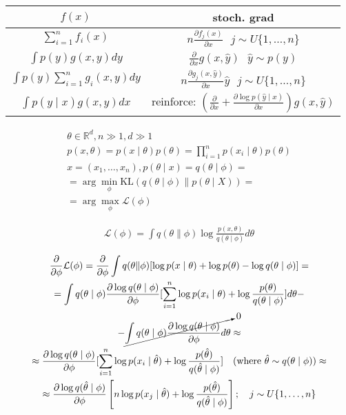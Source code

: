 \documentclass{book}
\begin{document}
\begin{tabular}{c|c}
    $f(x)$ &stoch. grad\\
    \hline
    $\sum_{i=1}^{n} {f_i(x)}$ & $n\frac{\partial f_j(x)}{\partial x}~~~j\sim U\{1,\dots,n\}$\\
    $\int {p(y)g(x,y)dy}$ &$\frac{\partial }{\partial x}g(x,\hat{y})~~~\hat{y}\sim p(y)$\\
    $\int {p(y)\sum_{i=1}^{n} {g_i(x,y)}dy}$ & $n\frac{\partial g_j(x,\hat{y})}{\partial x}\hat{y}~~~j\sim U\{1,\dots,n\}$\\
    $\int {p(y\mid x)g(x,y)dx}$ & reinforce: $\left(\frac{\partial }{\partial x}+\frac{\partial \log p(\hat{y}\mid x)}{\partial x}\right)g(x,\hat{y})$
\end{tabular}

\begin{gather*}
    \theta \in \mathbb{R}^d, n\gg 1, d\gg 1\\
    p(x,\theta)=p(x\mid \theta)p(\theta)=\prod_{i=1}^{n} {p(x_i\mid \theta)}p(\theta)\\
    x=(x_1,\dots,x_n), p(\theta\mid x)=q(\theta\mid \phi)=\\
    =\arg\min_\phi \mathrm{KL}(q(\theta\mid \phi)\|p(\theta\mid X))=\\
    =\arg\max_\phi \mathcal{L}(\phi)
\end{gather*}

\begin{gather*}
    \mathcal{L}(\phi)=\int {q(\theta\|\phi)\log\frac{p(x,\theta)}{q(\theta\mid \phi)}d\theta}
\end{gather*}

\begin{gather*}
    \frac{\partial }{\partial \phi}\mathcal{L}(\phi)=\frac{\partial }{\partial \phi}\int {q(\theta\|\phi)[\log p(x\mid \theta)+\log p(\theta)-\log q(\theta\mid \phi)]}=\\
    =\int {q(\theta\mid \phi)\frac{\partial \log q(\theta\mid \phi)}{\partial \phi}[\sum_{i=1}^{n} {\log p(x_i\mid \theta)+\log\frac{p(\theta)}{q(\theta\mid \phi)}}]d\theta}-\\
    -\cancelto{0}{\int {q(\theta\mid \phi)\frac{\partial \log q(\theta\mid \phi)}{\partial \phi}d\theta}}\approx\\
    \approx\frac{\partial \log q(\theta\mid \phi)}{\partial \phi}[\sum_{i=1}^{n} {\log p(x_i\mid \hat{\theta})+\log\frac{p(\hat{\theta})}{q(\hat{\theta}\mid \phi)}}]~~~\textrm{(where $\hat{\theta}\sim q(\theta\mid \phi)$)}\approx\\
    \approx \frac{\partial \log q(\hat{\theta}\mid \phi)}{\partial \phi}\left[n\log p(x_j\mid \hat{\theta})+\log \frac{p(\hat{\theta})}{q(\hat{\theta}\mid \phi)}\right];~~~j\sim U\{1,\dots,n\}
\end{gather*}
\end{document}
